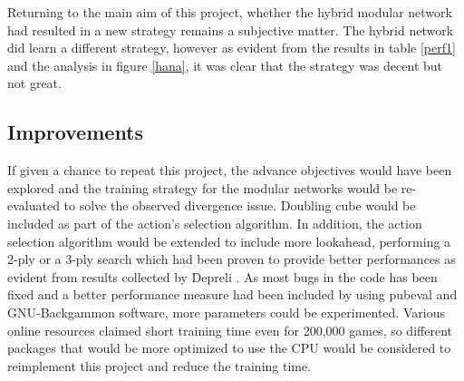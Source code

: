\documentclass[12pt,a4paper]{article}
\begin{document}
Returning to the main aim of this project, whether the hybrid modular network had resulted in a new strategy remains a subjective matter. The hybrid network did learn a different strategy, however as evident from the results in table \ref{perf1} and the analysis in figure \ref{hana}, it was clear that the strategy was decent but not great. 

\subsection{Improvements}
If given a chance to repeat this project, the advance objectives would have been explored and the training strategy for the modular networks would be re-evaluated to solve the observed divergence issue. Doubling cube would be included as part of the action’s selection algorithm. In addition, the action selection algorithm would be extended to include more lookahead, performing a 2-ply or a 3-ply search which had been proven to provide better performances as evident from results collected by Depreli \citeyear{botbattle}. As most bugs in the code has been fixed and a better performance measure had been included by using pubeval and GNU-Backgammon software, more parameters could be experimented. Various online resources claimed short training time even for 200,000 games, so different packages that would be more optimized to use the CPU would be considered to reimplement this project and reduce the training time.
\end{document}
